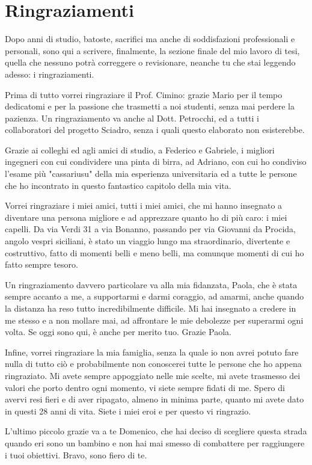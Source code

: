 \chapter*{Ringraziamenti}

Dopo anni di studio, batoste, sacrifici ma anche di soddisfazioni professionali e personali, sono qui a scrivere, finalmente, la sezione finale del mio lavoro di tesi, quella che nessuno potrà correggere o revisionare, neanche tu che stai leggendo adesso: i ringraziamenti.

Prima di tutto vorrei ringraziare il Prof. Cimino: grazie Mario per il tempo dedicatomi e per la passione che trasmetti a noi studenti, senza mai perdere la pazienza. 
Un ringraziamento va anche al Dott. Petrocchi, ed a tutti i collaboratori del progetto Sciadro, senza i quali questo elaborato non esisterebbe.

Grazie ai colleghi ed agli amici di studio, a Federico e Gabriele, i migliori ingegneri con cui condividere una pinta di birra, ad Adriano, con cui ho condiviso l'esame più "cassariusu" della mia esperienza universitaria ed a tutte le persone che ho incontrato in questo fantastico capitolo della mia vita.

Vorrei ringraziare i miei amici, tutti i miei amici, che mi hanno insegnato a diventare una persona migliore e ad apprezzare quanto ho di più caro: i miei capelli. 
Da via Verdi 31 a via Bonanno, passando per via Giovanni da Procida, angolo vespri siciliani, è stato un viaggio lungo ma straordinario, divertente e costruttivo, fatto di momenti belli e meno belli, ma comunque momenti di cui ho fatto sempre tesoro.

Un ringraziamento davvero particolare va alla mia fidanzata, Paola, che è stata sempre accanto a me, a supportarmi e darmi coraggio, ad amarmi, anche quando la distanza ha reso tutto incredibilmente difficile. 
Mi hai insegnato a credere in me stesso e a non mollare mai, ad affrontare le mie debolezze per superarmi ogni volta. 
Se oggi sono qui, è anche per merito tuo. 
Grazie Paola.

Infine, vorrei ringraziare la mia famiglia, senza la quale io non avrei potuto fare nulla di tutto ciò e probabilmente non conoscerei tutte le persone che ho appena ringraziato. 
Mi avete sempre appoggiato nelle mie scelte, mi avete trasmesso dei valori che porto dentro ogni momento, vi siete sempre fidati di me. 
Spero di avervi resi fieri e di aver ripagato, almeno in minima parte, quanto mi avete dato in questi 28 anni di vita. 
Siete i miei eroi e per questo vi ringrazio.

L'ultimo piccolo grazie va a te Domenico, che hai deciso di scegliere questa strada quando eri sono un bambino e non hai mai smesso di combattere per raggiungere i tuoi obiettivi. 
Bravo, sono fiero di te.
